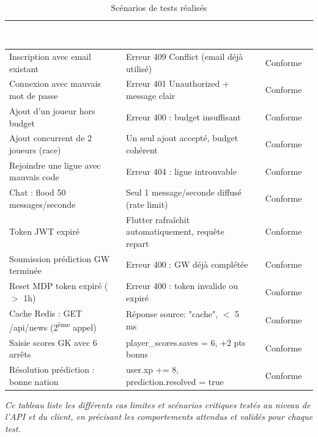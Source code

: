 \begin{table}[!htbp]
\centering
    \begin{tabularx}{\linewidth}{|X|X|c|}
        \hline
        \rowcolor{emsigreen}\textcolor{white}{\textbf{Scénario testé}} & \textcolor{white}{\textbf{Résultat attendu}} & \textcolor{white}{\textbf{Résultat obtenu}} \\
        \hline
        Inscription avec email existant & Erreur 409 Conflict (email déjà utilisé) & Conforme \\
        \hline
        Connexion avec mauvais mot de passe & Erreur 401 Unauthorized + message clair & Conforme \\
        \hline
        Ajout d'un joueur hors budget & Erreur 400 : budget insuffisant & Conforme \\
        \hline
        Ajout concurrent de 2 joueurs (race) & Un seul ajout accepté, budget cohérent & Conforme \\
        \hline
        Rejoindre une ligue avec mauvais code & Erreur 404 : ligue introuvable & Conforme \\
        \hline
        Chat : flood 50 messages/seconde & Seul 1 message/seconde diffusé (rate limit) & Conforme \\
        \hline
        Token JWT expiré & Flutter rafraîchit automatiquement, requête repart & Conforme \\
        \hline
        Soumission prédiction GW terminée & Erreur 400 : GW déjà complétée & Conforme \\
        \hline
        Reset MDP token expiré ($>$ 1h) & Erreur 400 : token invalide ou expiré & Conforme \\
        \hline
        Cache Redis : GET /api/news (2\textsuperscript{ème} appel) & Réponse source: "cache", $<$ 5 ms & Conforme \\
        \hline
        Saisie scores GK avec 6 arrêts & player\_scores.saves = 6, +2 pts bonus & Conforme \\
        \hline
        Résolution prédiction : bonne nation & user.xp += 8, prediction.resolved = true & Conforme \\
        \hline
    \end{tabularx}
\caption{Scénarios de tests réalisés}
\end{table}

\vspace{0.2cm}
\noindent\small\textit{Ce tableau liste les différents cas limites et scénarios critiques testés au niveau de l'API et du client, en précisant les comportements attendus et validés pour chaque test.}\normalsize

